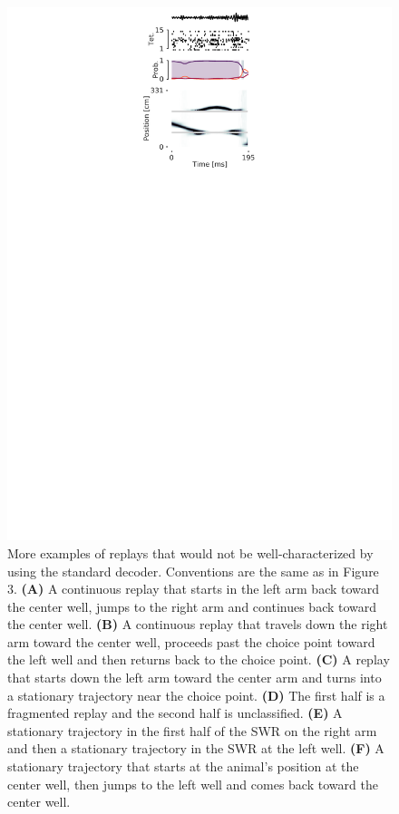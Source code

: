 \documentclass[times, twoside]{zHenriquesLab-StyleBioRxiv}
\begin{document}
\begin{figure}%
\centering
\includegraphics[width=0.80\linewidth]{figures/Figure3-supplemental1/Figure3_v4_supplemental1}
\caption{More examples of replays that would not be well-characterized by using the standard decoder. Conventions are the same as in Figure 3. \textbf{(A)} A continuous replay that starts in the left arm back toward the center well, jumps to the right arm and continues back toward the center well. \textbf{(B)} A continuous replay that travels down the right arm toward the center well, proceeds past the choice point toward the left well and then returns back to the choice point. \textbf{(C)} A replay that starts down the left arm toward the center arm and turns into a stationary trajectory near the choice point. \textbf{(D)} The first half is a fragmented replay and the second half is unclassified. \textbf{(E)} A stationary trajectory in the first half of the SWR on the right arm and then a stationary trajectory in the SWR at the left well. \textbf{(F)} A stationary trajectory that starts at the animal's position at the center well, then jumps to the left well and comes back toward the center well.
}
\label{fig:Figure3-Figure supplement 1}
\end{figure}
\end{document}
